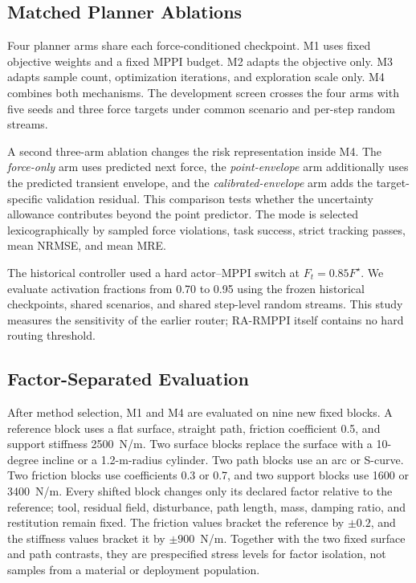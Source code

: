 \subsection{Matched Planner Ablations}

Four planner arms share each force-conditioned checkpoint. M1 uses fixed
objective weights and a fixed MPPI budget. M2 adapts the objective only. M3
adapts sample count, optimization iterations, and exploration scale only. M4
combines both mechanisms. The development screen crosses the four arms with
five seeds and three force targets under common scenario and per-step random
streams.

A second three-arm ablation changes the risk representation inside M4. The
\emph{force-only} arm uses predicted next force, the \emph{point-envelope}
arm additionally uses the predicted transient envelope, and the
\emph{calibrated-envelope} arm adds the target-specific validation residual.
This comparison tests whether the uncertainty allowance contributes beyond
the point predictor. The mode is selected lexicographically by sampled force
violations, task success, strict tracking passes, mean NRMSE, and mean MRE.

The historical controller used a hard actor--MPPI switch at
$F_t=0.85F^\star$. We evaluate activation fractions from 0.70 to 0.95 using
the frozen historical checkpoints, shared scenarios, and shared step-level
random streams. This study measures the sensitivity of the earlier router;
RA-RMPPI itself contains no hard routing threshold.

\subsection{Factor-Separated Evaluation}

After method selection, M1 and M4 are evaluated on nine new fixed blocks. A
reference block uses a flat surface, straight path, friction coefficient 0.5,
and support stiffness 2500~N/m. Two surface blocks replace the surface with a
10-degree incline or a 1.2-m-radius cylinder. Two path blocks use an arc or
S-curve. Two friction blocks use coefficients 0.3 or 0.7, and two support
blocks use 1600 or 3400~N/m. Every shifted block changes only its declared
factor relative to the reference; tool, residual field, disturbance, path
length, mass, damping ratio, and restitution remain fixed.
The friction values bracket the reference by $\pm0.2$, and the stiffness
values bracket it by $\pm900$~N/m. Together with the two fixed surface and path
contrasts, they are prespecified stress levels for factor isolation, not
samples from a material or deployment population.

